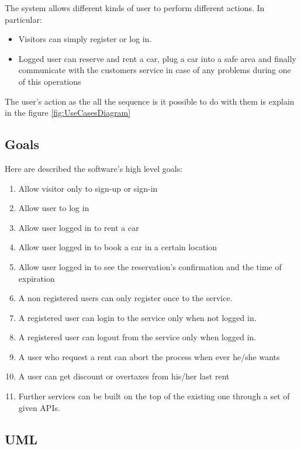The system allows different kinds of user to perform different actions. In particular:
\begin{itemize}
	\item Visitors can simply register or log in.
	\item Logged user can reserve and rent a car, plug a car into a safe area and finally communicate with the customers service in case of any problems during one of this operations
\end{itemize}
The user's action as the all the sequence is it possible to do with them is explain in the figure \ref{fig:UseCasesDiagram}

\subsection{Goals}
Here are described the software's high level goals:
\begin{enumerate}[label=\subscript{G}{\arabic*}]
	\item Allow visitor only to sign-up or sign-in
	\item Allow user to log in
	\item Allow user logged in to rent a car
	\item Allow user logged in to book a car in a certain location
	\item Allow user  logged in to see the reservation's confirmation and the time of expiration
	\item A non registered users can only register once to the service.
	\item A registered user can login to the service only when not logged in.
	\item A registered user can logout from the service only when logged in.
	\item A user who request a rent can abort the process when ever he/she wants
	\item A user can get discount or overtaxes from his/her last rent
	\item Further services can be built on the top of the existing one through a set of given APIs.
\end{enumerate}

\subsection{UML}	
\newpage